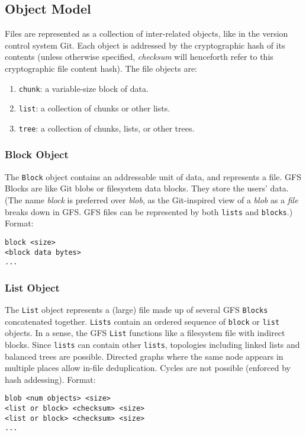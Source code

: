 \documentclass{sig-alternate}
\begin{document}

\subsection{Object Model}

Files are represented as a collection of inter-related objects, like in the
version control system Git. Each object is addressed by the cryptographic hash of its contents (unless otherwise specified, \textit{checksum} will henceforth refer to this cryptographic file content hash). The file objects are:

\begin{enumerate}
  \item \texttt{chunk}: a variable-size block of data.
  \item \texttt{list}: a collection of chunks or other lists.
  \item \texttt{tree}: a collection of chunks, lists, or other trees.
\end{enumerate}

\subsubsection{Block Object}

The \texttt{Block} object contains an addressable unit of data, and
represents a file.
GFS Blocks are like Git blobs or filesystem data blocks. They store the
users' data. (The name \textit{block} is preferred over \textit{blob}, as the
Git-inspired view of a \textit{blob} as a \textit{file} breaks down in GFS.
GFS files can be represented by both \texttt{lists} and \texttt{blocks}.)
Format:
\begin{verbatim}
block <size>
<block data bytes>
...
\end{verbatim}


\subsubsection{List Object}

The \texttt{List} object represents a (large) file made up of several
GFS \texttt{Blocks} concatenated together. \texttt{Lists} contain
an ordered sequence of \texttt{block} or \texttt{list} objects.
In a sense, the GFS \texttt{List} functions like a filesystem file with
indirect blocks. Since \texttt{lists} can contain other \texttt{lists}, topologies including linked lists and balanced trees are possible. Directed graphs where the same node appears in multiple places allow in-file deduplication. Cycles are not possible (enforced by hash addessing).
Format:
\begin{verbatim}
blob <num objects> <size>
<list or block> <checksum> <size>
<list or block> <checksum> <size>
...
\end{verbatim}
\end{document}
